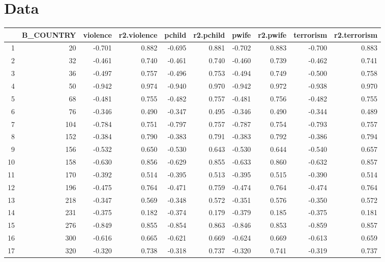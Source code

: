\documentclass{amsart}
\begin{document}
\section{Data}

\begin{longtable}{rrrrrrrrrr}
  \hline
 & B\_COUNTRY & violence & r2.violence & pchild & r2.pchild & pwife & r2.pwife & terrorism & r2.terrorism \\ 
  \hline
1 & 20 & -0.701 & 0.882 & -0.695 & 0.881 & -0.702 & 0.883 & -0.700 & 0.883 \\ 
  2 & 32 & -0.461 & 0.740 & -0.461 & 0.740 & -0.460 & 0.739 & -0.462 & 0.741 \\ 
  3 & 36 & -0.497 & 0.757 & -0.496 & 0.753 & -0.494 & 0.749 & -0.500 & 0.758 \\ 
  4 & 50 & -0.942 & 0.974 & -0.940 & 0.970 & -0.942 & 0.972 & -0.938 & 0.970 \\ 
  5 & 68 & -0.481 & 0.755 & -0.482 & 0.757 & -0.481 & 0.756 & -0.482 & 0.755 \\ 
  6 & 76 & -0.346 & 0.490 & -0.347 & 0.495 & -0.346 & 0.490 & -0.344 & 0.489 \\ 
  7 & 104 & -0.784 & 0.751 & -0.797 & 0.757 & -0.787 & 0.754 & -0.793 & 0.757 \\ 
  8 & 152 & -0.384 & 0.790 & -0.383 & 0.791 & -0.383 & 0.792 & -0.386 & 0.794 \\ 
  9 & 156 & -0.532 & 0.650 & -0.530 & 0.643 & -0.530 & 0.644 & -0.540 & 0.657 \\ 
  10 & 158 & -0.630 & 0.856 & -0.629 & 0.855 & -0.633 & 0.860 & -0.632 & 0.857 \\ 
  11 & 170 & -0.392 & 0.514 & -0.395 & 0.513 & -0.395 & 0.515 & -0.390 & 0.514 \\ 
  12 & 196 & -0.475 & 0.764 & -0.471 & 0.759 & -0.474 & 0.764 & -0.474 & 0.764 \\ 
  13 & 218 & -0.347 & 0.569 & -0.348 & 0.572 & -0.351 & 0.576 & -0.350 & 0.572 \\ 
  14 & 231 & -0.375 & 0.182 & -0.374 & 0.179 & -0.379 & 0.185 & -0.375 & 0.181 \\ 
  15 & 276 & -0.849 & 0.855 & -0.854 & 0.863 & -0.846 & 0.853 & -0.859 & 0.857 \\ 
  16 & 300 & -0.616 & 0.665 & -0.621 & 0.669 & -0.624 & 0.669 & -0.613 & 0.659 \\ 
  17 & 320 & -0.320 & 0.738 & -0.318 & 0.737 & -0.320 & 0.741 & -0.319 & 0.737 \\ 

\end{longtable}
\end{document}
